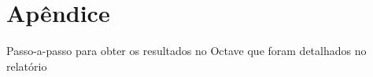 \documentclass[10pt, conference, compsocconf]{IEEEtran}
\begin{document}
\section{Apêndice}
Passo-a-passo para obter os resultados no Octave que foram detalhados no relatório

%
%



%
%
\end{document}
